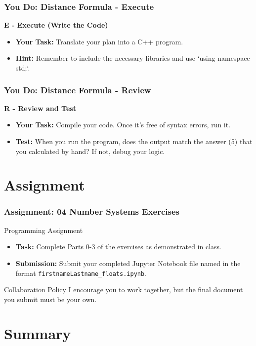 \documentclass{beamer}
\begin{document}
\begin{frame}[fragile]
\frametitle{You Do: Distance Formula - Execute}
\textbf{E - Execute (Write the Code)}
\begin{itemize}
    \item \textbf{Your Task:} Translate your plan into a C++ program.
    \item \textbf{Hint:} Remember to include the necessary libraries and use `using namespace std;`.
\end{itemize}
\end{frame}

\begin{frame}
\frametitle{You Do: Distance Formula - Review}
\textbf{R - Review and Test}
\begin{itemize}
    \item \textbf{Your Task:} Compile your code. Once it's free of syntax errors, run it.
    \item \textbf{Test:} When you run the program, does the output match the answer (5) that you calculated by hand? If not, debug your logic.
\end{itemize}
\end{frame}


\section{Assignment}
\begin{frame}
\frametitle{Assignment: 04 Number Systems Exercises}
\begin{block}{Programming Assignment}
    \begin{itemize}
        \item \textbf{Task:} Complete Parts 0-3 of the exercises as demonstrated in class.
        \item \textbf{Submission:} Submit your completed Jupyter Notebook file named in the format \alert{\texttt{firstnameLastname\_floats.ipynb}}.
    \end{itemize}
\end{block}
\vfill
\begin{alertblock}{Collaboration Policy}
I encourage you to work together, but the final document you submit must be your own.
\end{alertblock}
\end{frame}

\section{Summary}
\end{document}
